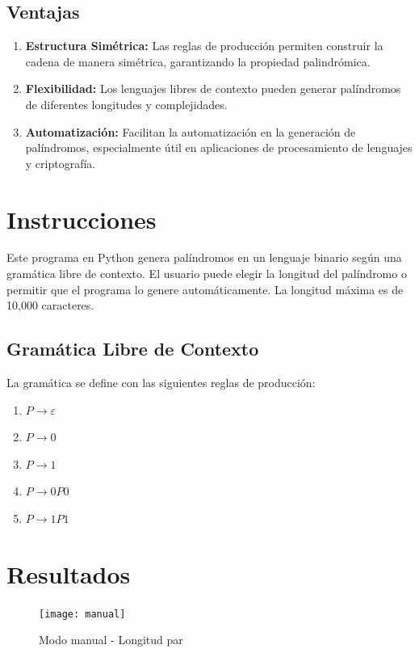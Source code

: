 \documentclass[11pt]{article} %
\begin{document}
	\subsection*{Ventajas}
	\begin{enumerate}
		\item \textbf{Estructura Simétrica:} Las reglas de producción permiten construir la cadena de manera simétrica, garantizando la propiedad palindrómica.
		\item \textbf{Flexibilidad:} Los lenguajes libres de contexto pueden generar palíndromos de diferentes longitudes y complejidades.
		\item \textbf{Automatización:} Facilitan la automatización en la generación de palíndromos, especialmente útil en aplicaciones de procesamiento de lenguajes y criptografía.
	\end{enumerate}
	
	\section{Instrucciones}
	Este programa en Python genera palíndromos en un lenguaje binario según una gramática libre de contexto. El usuario puede elegir la longitud del palíndromo o permitir que el programa lo genere automáticamente. La longitud máxima es de 10,000 caracteres.
	
	\subsection*{Gramática Libre de Contexto}
	La gramática se define con las siguientes reglas de producción:
	\begin{enumerate}
		\item \( P \rightarrow \varepsilon \)
		\item \( P \rightarrow 0 \)
		\item \( P \rightarrow 1 \)
		\item \( P \rightarrow 0P0 \)
		\item \( P \rightarrow 1P1 \)
	\end{enumerate}
	
	
	
	\section{Resultados}
	
	
	\begin{figure}[h]
		\centering
		\texttt{[image: manual]}
		\caption{Modo manual - Longitud par}
	\end{figure}
	
\end{document}
